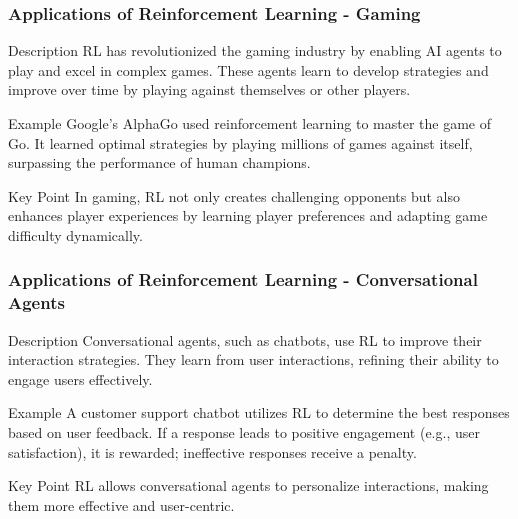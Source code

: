 \documentclass[aspectratio=169]{beamer}
\begin{document}
\begin{frame}[fragile]
    \frametitle{Applications of Reinforcement Learning - Gaming}
    \begin{block}{Description}
        RL has revolutionized the gaming industry by enabling AI agents to play and excel in complex games. These agents learn to develop strategies and improve over time by playing against themselves or other players.
    \end{block}
    
    \begin{block}{Example}
        Google's AlphaGo used reinforcement learning to master the game of Go. It learned optimal strategies by playing millions of games against itself, surpassing the performance of human champions.
    \end{block}
    
    \begin{block}{Key Point}
        In gaming, RL not only creates challenging opponents but also enhances player experiences by learning player preferences and adapting game difficulty dynamically.
    \end{block}
\end{frame}

\begin{frame}[fragile]
    \frametitle{Applications of Reinforcement Learning - Conversational Agents}
    \begin{block}{Description}
        Conversational agents, such as chatbots, use RL to improve their interaction strategies. They learn from user interactions, refining their ability to engage users effectively.
    \end{block}
    
    \begin{block}{Example}
        A customer support chatbot utilizes RL to determine the best responses based on user feedback. If a response leads to positive engagement (e.g., user satisfaction), it is rewarded; ineffective responses receive a penalty.
    \end{block}
    
    \begin{block}{Key Point}
        RL allows conversational agents to personalize interactions, making them more effective and user-centric.
    \end{block}
\end{frame}
\end{document}
